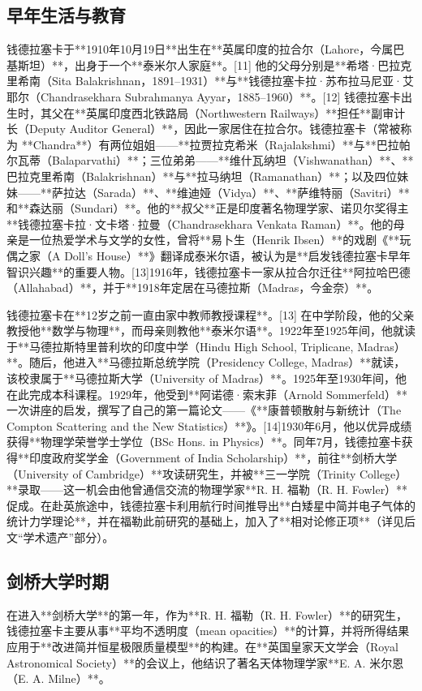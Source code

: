 \subsection{早年生活与教育}
钱德拉塞卡于**1910年10月19日**出生在**英属印度的拉合尔（Lahore，今属巴基斯坦）**，出身于一个**泰米尔人家庭**。[11] 他的父母分别是**希塔·巴拉克里希南（Sita Balakrishnan，1891–1931）**与**钱德拉塞卡拉·苏布拉马尼亚·艾耶尔（Chandrasekhara Subrahmanya Ayyar，1885–1960）**。[12] 钱德拉塞卡出生时，其父在**英属印度西北铁路局（Northwestern Railways）**担任**副审计长（Deputy Auditor General）**，因此一家居住在拉合尔。钱德拉塞卡（常被称为 **Chandra**）有两位姐姐——**拉贾拉克希米（Rajalakshmi）**与**巴拉帕尔瓦蒂（Balaparvathi）**；三位弟弟——**维什瓦纳坦（Vishwanathan）**、**巴拉克里希南（Balakrishnan）**与**拉马纳坦（Ramanathan）**；以及四位妹妹——**萨拉达（Sarada）**、**维迪娅（Vidya）**、**萨维特丽（Savitri）**和**森达丽（Sundari）**。他的**叔父**正是印度著名物理学家、诺贝尔奖得主**钱德拉塞卡拉·文卡塔·拉曼（Chandrasekhara Venkata Raman）**。他的母亲是一位热爱学术与文学的女性，曾将**易卜生（Henrik Ibsen）**的戏剧《**玩偶之家（A Doll’s House）**》翻译成泰米尔语，被认为是**启发钱德拉塞卡早年智识兴趣**的重要人物。[13]1916年，钱德拉塞卡一家从拉合尔迁往**阿拉哈巴德（Allahabad）**，并于**1918年定居在马德拉斯（Madras，今金奈）**。

钱德拉塞卡在**12岁之前一直由家中教师教授课程**。[13] 在中学阶段，他的父亲教授他**数学与物理**，而母亲则教他**泰米尔语**。1922年至1925年间，他就读于**马德拉斯特里普利坎的印度中学（Hindu High School, Triplicane, Madras）**。随后，他进入**马德拉斯总统学院（Presidency College, Madras）**就读，该校隶属于**马德拉斯大学（University of Madras）**。1925年至1930年间，他在此完成本科课程。1929年，他受到**阿诺德·索末菲（Arnold Sommerfeld）**一次讲座的启发，撰写了自己的第一篇论文——《**康普顿散射与新统计（The Compton Scattering and the New Statistics）**》。[14]1930年6月，他以优异成绩获得**物理学荣誉学士学位（BSc Hons. in Physics）**。同年7月，钱德拉塞卡获得**印度政府奖学金（Government of India Scholarship）**，前往**剑桥大学（University of Cambridge）**攻读研究生，并被**三一学院（Trinity College）**录取——这一机会由他曾通信交流的物理学家**R. H. 福勒（R. H. Fowler）**促成。在赴英旅途中，钱德拉塞卡利用航行时间推导出**白矮星中简并电子气体的统计力学理论**，并在福勒此前研究的基础上，加入了**相对论修正项**（详见后文“学术遗产”部分）。
\subsection{剑桥大学时期}
在进入**剑桥大学**的第一年，作为**R. H. 福勒（R. H. Fowler）**的研究生，钱德拉塞卡主要从事**平均不透明度（mean opacities）**的计算，并将所得结果应用于**改进简并恒星极限质量模型**的构建。在**英国皇家天文学会（Royal Astronomical Society）**的会议上，他结识了著名天体物理学家**E. A. 米尔恩（E. A. Milne）**。

